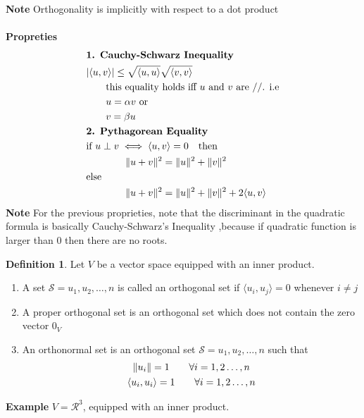 \documentclass[
12pt,
]{article}
\newcommand{\ex}{\textbf{Example}}
\newcommand{\un}{u_1 , u_2 , \dots , n}
\newcommand{\la}{\langle}
\newcommand{\ra}{\rangle}
\DeclarePairedDelimiter{\norm}{\lVert}{\rVert}
\theoremstyle{definition}
\theoremstyle{definition}
\theoremstyle{definition}
\newtheorem{Definition}{Definition}[section]
\theoremstyle{definition}
\begin{document}
\textbf{Note} Orthogonality is implicitly with respect to a dot product \\ \\ 
\textbf{Propreties} 
\begin{align*}
	&\textbf{1. Cauchy-Schwarz Inequality} \\
	& \abs{ \la  u,v \ra } \leq \sqrt{ \la  u,u \ra } \sqrt{ \la  v,v \ra } \\
	&\qquad \text{this equality holds iff $u$ and $v$ are $//$. i.e} \\
	& \qquad u = \alpha v \text{ or} \\
	& \qquad v = \beta u \\
	& \textbf{2. Pythagorean Equality} \\
	& \text{if } u \perp v \iff  \la  u,v\ra = 0  \quad \text{then}  \\
	& \hspace{40pt} \norm{u+v}^2 = \norm{u}^2 + \norm{v}^2 \\
	& \text{else } \\
	& \hspace{40pt} \norm{u+v}^2 = \norm{u}^2 + \norm{v}^2 + 2 \la  u,v\ra \\
\end{align*}
\textbf{Note} 
For the previous proprieties, note that the discriminant in the quadratic formula is basically Cauchy-Schwarz's Inequality ,because if quadratic function is larger than 0 then there are no roots.
\begin{Definition}
	Let $V$ be a vector space equipped with an inner product.
	\begin{enumerate}
	\item A set $\mathcal{S} = {\un}$ is called an orthogonal set if $ \la  u_i, u_j\ra = 0$ whenever $ i \neq j$
	\item A proper orthogonal set is an orthogonal set which does not contain the zero vector $0_V$
	\item An orthonormal set is an orthogonal set $\mathcal{S} = {\un}$ such that 
	\begin{gather*}
		\norm{u_i} = 1 \qquad \forall i = 1,2 \dots ,n \\
		 \la  u_i, u_i\ra = 1 \qquad \forall i = 1,2 \dots, n
	\end{gather*}
	\end{enumerate}
\end{Definition}
\ex 
$V = \mathcal{R}^3$, equipped with an inner product. 
\end{document}
